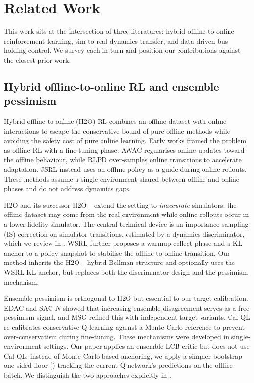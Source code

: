 \section{Related Work}
\label{sec:related}

This work sits at the intersection of three literatures: hybrid offline-to-online reinforcement learning, sim-to-real dynamics transfer, and data-driven bus holding control.
We survey each in turn and position our contributions against the closest prior work.

\subsection{Hybrid offline-to-online RL and ensemble pessimism}

Hybrid offline-to-online (H2O) RL combines an offline dataset with online interactions to escape the conservative bound of pure offline methods while avoiding the safety cost of pure online learning.
Early works framed the problem as offline RL with a fine-tuning phase: AWAC \citep{nair2020awac} regularises online updates toward the offline behaviour, while RLPD \citep{ball2023efficient} over-samples online transitions to accelerate adaptation.
JSRL \citep{uchendu2023jumpstart} instead uses an offline policy as a guide during online rollouts.
These methods assume a single environment shared between offline and online phases and do not address dynamics gaps.

H2O \citep{niu2022h2o} and its successor H2O+ \citep{liu2024h2oplus} extend the setting to \emph{inaccurate} simulators: the offline dataset may come from the real environment while online rollouts occur in a lower-fidelity simulator.
The central technical device is an importance-sampling (IS) correction on simulator transitions, estimated by a dynamics discriminator, which we review in .
WSRL \citep{zhou2024wsrl} further proposes a warmup-collect phase and a KL anchor to a policy snapshot to stabilise the offline-to-online transition.
Our method inherits the H2O+ hybrid Bellman structure and optionally uses the WSRL KL anchor, but replaces both the discriminator design and the pessimism mechanism.

Ensemble pessimism is orthogonal to H2O but essential to our target calibration.
EDAC and SAC-$N$ \citep{an2021uncertainty} showed that increasing ensemble disagreement serves as a free pessimism signal, and MSG \citep{ghasemipour2022so} refined this with independent-target variants.
Cal-QL \citep{nakamoto2023calql} re-calibrates conservative Q-learning \citep{kumar2020cql} against a Monte-Carlo reference to prevent over-conservatism during fine-tuning.
These mechanisms were developed in single-environment settings.
Our paper applies an ensemble LCB critic but does not use Cal-QL: instead of Monte-Carlo-based anchoring, we apply a simpler bootstrap one-sided floor () tracking the current Q-network's predictions on the offline batch.
We distinguish the two approaches explicitly in .

